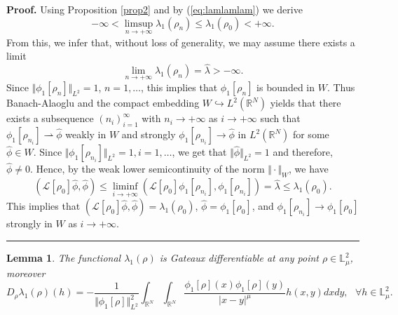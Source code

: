 \documentclass[12pt,thmsa]{article}
\newtheorem{lemma}[theorem]{Lemma}
\newenvironment{proof}[1][Proof]{\noindent\textbf{#1.} }{\ \rule{0.5em}{0.5em}}
\begin{document}
\begin{proof}
Using Proposition \ref{prop2} and by (\ref{eq:lamlamlam}) we derive
\begin{equation*}
-\infty <\limsup_{n\rightarrow +\infty }\lambda _{1}(\rho _{n})\leq \lambda
_{1}(\rho _{0})<+\infty .
\end{equation*}%
From this, we infer that, without loss of generality, we may assume there
exists a limit
\begin{equation*}
\lim_{n\rightarrow +\infty }\lambda _{1}(\rho _{n})=\hat{\lambda}>-\infty .
\end{equation*}%
Since $\Vert \phi _{1}[\rho _{n}]\Vert _{L^{2}}=1$, $n=1,\ldots $, this
implies that $\phi _{1}[\rho _{n}]$ is bounded in $W$. Thus Banach-Alaoglu
and the compact embedding $W\hookrightarrow L^{2}(\mathbb{R}^{N})$ yields
that there exists a subsequence $(n_{i})_{i=1}^{\infty }$ with $%
n_{i}\rightarrow +\infty $ as $i\rightarrow +\infty $ such that $\phi
_{1}[\rho _{n_{i}}]\rightharpoonup \hat{\phi}$ weakly in $W$ and strongly $%
\phi _{1}[\rho _{n_{i}}]\rightarrow \hat{\phi}$ in $L^{2}(\mathbb{R}^{N})$
for some $\hat{\phi}\in W$. Since $\Vert \phi _{1}[\rho _{n_{i}}]\Vert
_{L^{2}}=1,i=1,\ldots $, we get that $\Vert \hat{\phi}\Vert _{L^{2}}=1$ and
therefore, $\hat{\phi}\neq 0$. Hence, by the weak lower semicontinuity of
the norm $\Vert \cdot \Vert _{W}$, we have
\begin{equation*}
(\mathcal{L}[\rho _{0}]\hat{\phi},\hat{\phi})\leq \liminf_{i\rightarrow
+\infty }(\mathcal{L}[\rho _{0}]\phi _{1}[\rho _{n_{i}}],\phi _{1}[\rho
_{n_{i}}])=\hat{\lambda}\leq \lambda _{1}(\rho _{0}).
\end{equation*}%
This implies that $(\mathcal{L}[\rho _{0}]\hat{\phi},\hat{\phi})=\lambda
_{1}(\rho _{0})$, $\hat{\phi}=\phi _{1}[\rho _{0}]$, and $\phi _{1}[\rho
_{n_{i}}]\rightarrow \phi _{1}[\rho _{0}]$ strongly in $W$ as $i\rightarrow
+\infty $.
\end{proof}

\begin{lemma}
\label{lem10} The functional $\lambda _{1}(\rho )$ is Gateaux differentiable
at any point $\rho \in \mathbb{L}_{\mu }^{2}$, moreover
\begin{equation}
D_{\rho }\lambda _{1}(\rho )(h)=-\frac{1}{\Vert \phi _{1}[\rho ]\Vert
_{L^{2}}^{2}}\int_{\mathbb{R}^{N}}\int_{\mathbb{R}^{N}}\frac{\phi _{1}[\rho
](x)\phi _{1}[\rho ](y)}{|x-y|^{\mu }}h(x,y)dxdy,\text{ }\forall h\in
\mathbb{L}_{\mu }^{2}.  \label{eq:Val}
\end{equation}
\end{lemma}
\end{document}
